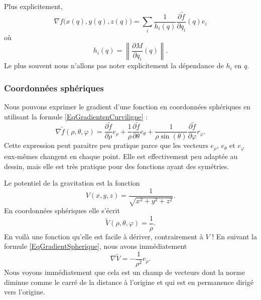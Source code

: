 Plus explicitement,
\begin{equation}        \label{EqGradientenCurviligne}
	\nabla f\big( x(q),y(q),z(q) \big)=\sum_i \frac{1}{ h_i(q) }\frac{ \partial \tilde f }{ \partial q_i }(q)e_i
\end{equation}
où
\begin{equation}
	h_i(q)=\left\| \frac{ \partial M }{ \partial q_i }(q) \right\|.
\end{equation}
Le plus souvent nous n'allons pas noter explicitement la dépendance de $h_i$ en $q$.

\subsubsection{Coordonnées sphériques}

Nous pouvons exprimer le gradient d'une fonction en coordonnées sphériques en utilisant la formule \eqref{EqGradientenCurviligne} :
\begin{equation}        \label{EqGradientSpherique}
	\nabla\tilde f(\rho,\theta,\varphi)=\frac{ \partial \tilde f }{ \partial \rho }e_{\rho}+\frac{1}{ \rho }\frac{ \partial \tilde f }{ \partial \theta }e_{\theta}+\frac{1}{ \rho\sin(\theta) }\frac{ \partial \tilde f }{ \partial \varphi }r_{\varphi}.
\end{equation}
Cette expression peut paraitre peu pratique parce que les vecteurs $e_{\rho}$, $e_{\theta}$ et $e_{\varphi}$ eux-mêmes changent en chaque point. Elle est effectivement peu adaptée au dessin, mais elle est très pratique pour des fonctions ayant des symétries.

\begin{example}
	Le potentiel de la gravitation est la fonction
	\begin{equation}
		V(x,y,z)=\frac{1}{ \sqrt{x^2+y^2+z^2} }.
	\end{equation}
	En coordonnées sphériques elle s'écrit
	\begin{equation}
		\tilde V(\rho,\theta,\varphi)=\frac{1}{ \rho }.
	\end{equation}
	En voilà une fonction qu'elle est facile à dériver, contrairement à $V$ ! En suivant la formule \eqref{EqGradientSpherique}, nous avons immédiatement
	\begin{equation}
		\nabla\tilde V=-\frac{1}{ \rho^2 }e_{\rho}.
	\end{equation}
	Nous voyons immédiatement que cela est un champ de vecteurs dont la norme diminue comme le carré de la distance à l'origine et qui est en permanence dirigé vers l'origine.
\end{example}

